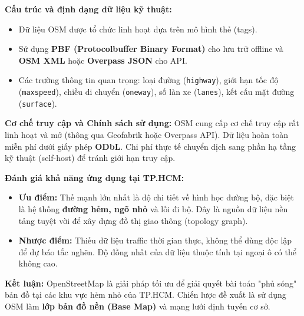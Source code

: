 \textbf{Cấu trúc và định dạng dữ liệu kỹ thuật:}
\begin{itemize}
    \item Dữ liệu OSM được tổ chức linh hoạt dựa trên mô hình thẻ (tags).
    \item Sử dụng \textbf{PBF (Protocolbuffer Binary Format)} cho lưu trữ offline và \textbf{OSM XML} hoặc \textbf{Overpass JSON} cho API.
    \item Các trường thông tin quan trọng: loại đường (\texttt{highway}), giới hạn tốc độ (\texttt{maxspeed}), chiều di chuyển (\texttt{oneway}), số làn xe (\texttt{lanes}), kết cấu mặt đường (\texttt{surface}).
\end{itemize}

\textbf{Cơ chế truy cập và Chính sách sử dụng:} OSM cung cấp cơ chế truy cập rất linh hoạt và mở (thông qua Geofabrik hoặc Overpass API). Dữ liệu hoàn toàn miễn phí dưới giấy phép \textbf{ODbL}. Chi phí thực tế chuyển dịch sang phần hạ tầng kỹ thuật (self-host) để tránh giới hạn truy cập.

\textbf{Đánh giá khả năng ứng dụng tại TP.HCM:}
\begin{itemize}
    \item \textbf{Ưu điểm:} Thế mạnh lớn nhất là độ chi tiết về hình học đường bộ, đặc biệt là hệ thống \textbf{đường hẻm, ngõ nhỏ} và lối đi bộ. Đây là nguồn dữ liệu nền tảng tuyệt vời để xây dựng đồ thị giao thông (topology graph).
    \item \textbf{Nhược điểm:} Thiếu dữ liệu traffic thời gian thực, không thể dùng độc lập để dự báo tắc nghẽn. Độ đồng nhất của dữ liệu thuộc tính tại ngoại ô có thể không cao.
\end{itemize}

\textbf{Kết luận:} OpenStreetMap là giải pháp tối ưu để giải quyết bài toán "phủ sóng" bản đồ tại các khu vực hẻm nhỏ của TP.HCM. Chiến lược đề xuất là sử dụng OSM làm \textbf{lớp bản đồ nền (Base Map)} và mạng lưới định tuyến cơ sở.

